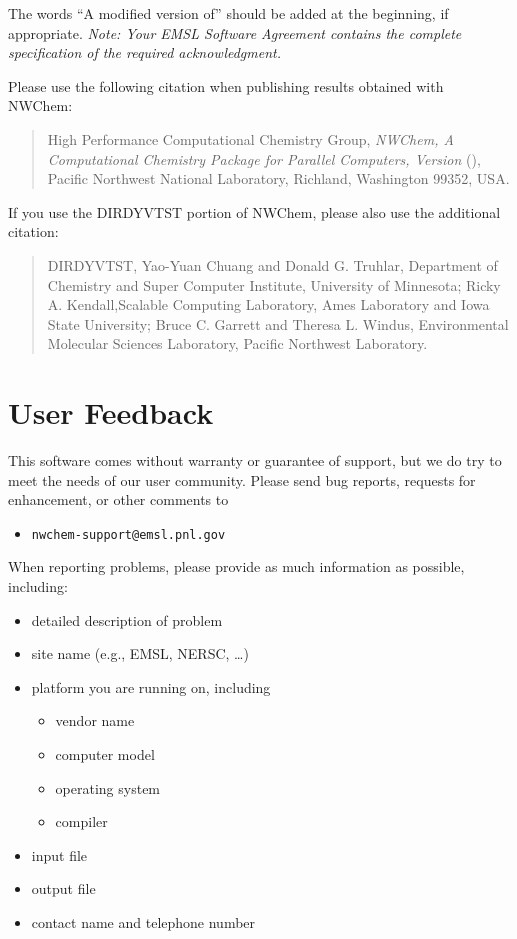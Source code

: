 The words ``A modified version of'' should be added at the beginning,
if appropriate.  {\em Note: Your EMSL Software Agreement contains the
complete specification of the required acknowledgment.}

Please use the following citation when publishing results obtained
with NWChem:
\begin{quote}
  High Performance Computational Chemistry Group, {\em NWChem, A
   Computational Chemistry Package for Parallel Computers, Version
    \nwchemversion{}} (\nwchemyear), Pacific Northwest National
  Laboratory, Richland, Washington 99352, USA.
\end{quote}

If you use the DIRDYVTST portion of NWChem, please also use the additional
citation:
\begin{quote}
  DIRDYVTST, Yao-Yuan Chuang and Donald G. Truhlar,
  Department of Chemistry and Super Computer Institute,
  University of Minnesota; Ricky A. Kendall,Scalable Computing Laboratory,
  Ames Laboratory and Iowa State University; Bruce C. Garrett and Theresa L. 
  Windus, Environmental Molecular Sciences Laboratory, Pacific Northwest 
  Laboratory.
\end{quote}

\section{User Feedback}

This software comes without warranty or guarantee of support,
but we do try to meet the needs of our user community.  Please send bug
reports, requests for enhancement, or other comments to

\begin{itemize}
\item {\tt nwchem-support@emsl.pnl.gov}
\end{itemize}

When reporting problems, please provide as much information as possible, 
including:

\begin{itemize}
\item detailed description of problem
\item site name (e.g., EMSL, NERSC, \ldots)
\item platform you are running on, including
\begin{itemize}
\item vendor name
\item computer model
\item operating system
\item compiler
\end{itemize}
\item input file
\item output file
\item contact name and telephone number
\end{itemize}

